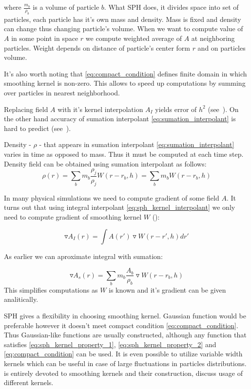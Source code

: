 where $\frac{m_b}{\rho_b}$ is a volume of particle $b$. What SPH does, it divides space into set of particles, each particle has it's own mass and density. Mass is fixed and density can change thus changing particle's volume. When we want to compute value of $A$ in some point in space $r$ we compute weighted average of $A$ at neighboring particles. Weight depends on distance of particle's center form $r$ and on particles volume. 

It's also worth noting that \ref{eq:compact_condition} defines finite domain in which smoothing kernel is non-zero. This allows to speed up computations by summing over particles in nearest neighborhood.

Replacing field $A$ with it's kernel interpolation $A_I$ yields error of $h^2$ (see~\cite[section 2.2.1]{Liu}). On the other hand accuracy of sumation interpolant \ref{eq:sumation_interpolant} is hard to predict (see~\cite[section 12.1]{Monaghan1992}).

Density - $\rho$ - that appears in sumation interpolant \ref{eq:sumation_interpolant} varies in time as opposed to mass. Thus it must be computed at each time step. Density field can be obtained using sumation interpolant as follows:
\begin{equation}
\label{eq:sph_density}
\rho(r) = \sum_{b}m_b\frac{\rho_j}{\rho_j}W(r-r_b, h) = \sum_{b}m_b W(r-r_b, h)
\end{equation}

In many physical simulations we need to compute gradient of some field $A$. It turns out that using integral interpolant \ref{eq:sph_kernel_interpolant} we only need to compute gradient of smoothing kernel $W$ (\cite[section 2.2.2]{Liu}):

\begin{equation}
\label{eq:integral_interpolant_gradient}
\triangledown A_I(r) = \int A(r') \triangledown W(r - r', h)dr'
\end{equation}

As earlier we can aproximate integral with sumation:

\begin{equation}
\label{eq:sumation_interpolant_gradient}
\triangledown A_s(r) = \sum_{b}m_b\frac{A_b}{\rho_b}\triangledown W(r-r_b,h) 
\end{equation}
This simplifies computations as $W$ is known and it's gradient can be given analitically. 

SPH gives a flexibility in choosing smoothing kernel. Gaussian function would be preferable however it doesn't meet compact condition \ref{eq:compact_condition}. Thus Gaussian-like functions are usually constructed, although any function that satisfies \ref{eq:sph_kernel_property_1}, \ref{eq:sph_kernel_property_2} and \ref{eq:compact_condition} can be used. It is even possible to utilize variable width kernels \cite[section 6]{Monaghan1992} which can be useful in case of large fluctuations in particles distributions. \cite[chapter 3]{Liu} is entirely devoted to smoothing kernels and their construction, \cite[section 3.5]{Muller2003} discuss usage of different kernels. 


